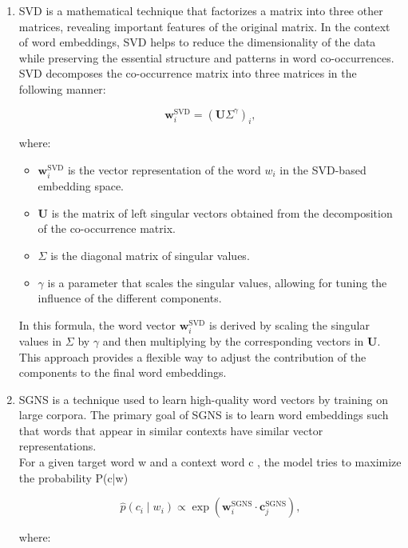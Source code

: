 \begin{enumerate}
    \item
{}
SVD is a mathematical technique that factorizes a matrix into three other matrices, revealing important features of the original matrix.
In the context of word embeddings, SVD helps to reduce the dimensionality of the data while preserving the essential structure and patterns in word co-occurrences.
SVD decomposes the co-occurrence matrix into three matrices in the following manner:

\begin{equation}
\mathbf{w}_i^{\text{SVD}} = (\mathbf{U} \Sigma^\gamma)_i,
\label{eq:svd}
\end{equation}

where:
\begin{itemize}
    \item $\mathbf{w}_i^{\text{SVD}}$ is the vector representation of the word $w_i$ in the SVD-based embedding space.
    \item $\mathbf{U}$ is the matrix of left singular vectors obtained from the decomposition of the co-occurrence matrix.
    \item $\Sigma$ is the diagonal matrix of singular values.
    \item $\gamma$ is a parameter that scales the singular values, allowing for tuning the influence of the different components.
\end{itemize}

In this formula, the word vector $\mathbf{w}_i^{\text{SVD}}$ is derived by scaling the singular values in $\Sigma$ by $\gamma$ and then multiplying by the corresponding vectors in $\mathbf{U}$.
This approach provides a flexible way to adjust the contribution of the components to the final word embeddings.

    \item
{}
SGNS is a technique used to learn high-quality word vectors by training on large corpora.
The primary goal of SGNS is to learn word embeddings such that words that appear in similar contexts have similar vector representations.
\\
For a given target word  w  and a context word  c , the model tries to maximize the probability  P(c|w)

\begin{equation}
\hat{p}(c_i \mid w_i) \propto \exp(\mathbf{w}_i^{\text{SGNS}} \cdot \mathbf{c}_j^{\text{SGNS}}),
\label{eq:sgns}
\end{equation}

where:


\end{enumerate}
